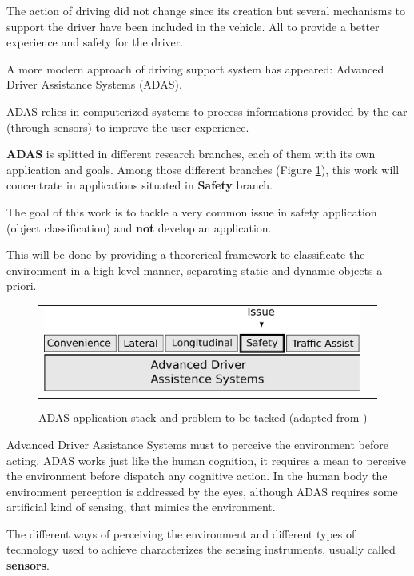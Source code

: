 The action of driving did not change since its creation but several mechanisms to support the driver have been included in the vehicle. All to provide a better experience and safety for the driver\cite{riener2010sensor}.

A more modern approach of driving support system has appeared: Advanced Driver Assistance Systems (ADAS). 

ADAS relies in computerized systems to process informations provided by the car (through sensors) to improve the user experience. 

\textbf{ADAS} is splitted in different research branches, each of them with its own application and goals. Among those different branches (Figure \ref{fig:sensor:target}), this work will concentrate in applications situated in \textbf{Safety} branch. 

The goal of this work is to tackle a very common issue in safety application (object classification) and \textbf{not} develop an application.

This will be done by providing a theorerical framework to classificate the environment in a high level manner, separating static and dynamic objects a priori.

\begin{figure}[h]
\centering
	\begin{tabular}{lr}\\
		\includegraphics[scale=0.7]{img/fig:sensor:target} 
	\end{tabular}
	\caption{ADAS application stack and problem to be tacked (adapted from \cite{riener2010sensor})}
	\label{fig:sensor:target}
\end{figure}

Advanced Driver Assistance Systems must to perceive the environment before acting. ADAS works just like the human cognition, it requires a mean to perceive the environment before dispatch any cognitive action. In the human body the environment perception is addressed by the eyes, although ADAS requires some artificial kind of sensing, that mimics the environment. 

The different ways of perceiving the environment and different types of technology used to achieve characterizes the sensing instruments, usually called \textbf{sensors}.

